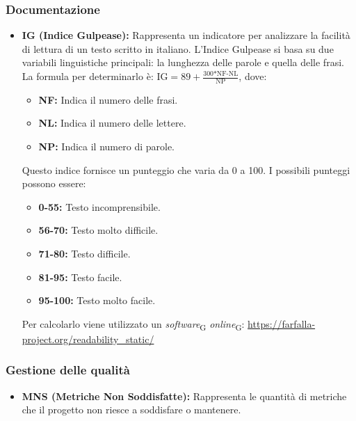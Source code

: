 \subsubsection{Documentazione}
\begin{itemize}
    \item \textbf{IG (Indice Gulpease):} Rappresenta un indicatore per analizzare la facilità di lettura di un testo scritto in italiano. L’Indice Gulpease si basa su due variabili linguistiche principali: la lunghezza delle parole e quella delle frasi. \\
    La formula per determinarlo è: \( \text{IG} = 89+\frac{\text{300*NF-NL}}{\text{NP}} \), dove:
    \begin{itemize}
        \item \textbf{NF:} Indica il numero delle frasi.
        \item \textbf{NL:} Indica il numero delle lettere.
        \item \textbf{NP:} Indica il numero di parole.
    \end{itemize}
    Questo indice fornisce un punteggio che varia da 0 a 100. I possibili punteggi possono essere:
    \begin{itemize}
        \item \textbf{0-55:} Testo incomprensibile.
        \item \textbf{56-70:} Testo molto difficile.
        \item \textbf{71-80:} Testo difficile.
        \item \textbf{81-95:} Testo facile.
        \item \textbf{95-100:} Testo molto facile.
    \end{itemize}
    Per calcolarlo viene utilizzato un \textit{software}\textsubscript{G} \textit{online}\textsubscript{G}: \url{https://farfalla-project.org/readability_static/}
\end{itemize}
\subsubsection{Gestione delle qualità}
\begin{itemize}
    \item \textbf{MNS (Metriche Non Soddisfatte):} Rappresenta le quantità di metriche che il progetto non riesce a soddisfare o mantenere.
\end{itemize}

